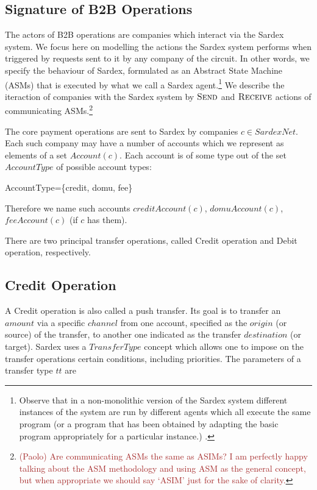 \subsection{Signature of B2B Operations}
The actors of B2B operations are companies which interact via the Sardex system. We focus here on modelling the actions the Sardex system performs when triggered by requests sent to it by any company of the circuit. In other words, we specify the behaviour of Sardex, formulated as an Abstract State Machine (ASMs) that is executed by what we call a Sardex agent.\footnote{Observe that in a non-monolithic version of the Sardex system different instances of the system are run by different agents which all execute the same program (or a program that has been obtained by adapting the basic program appropriately for a particular instance.) .} We describe the iteraction of companies with the Sardex system by $\hbox{\sc Send}$ and $\hbox{\sc Receive}$ actions of communicating ASMs.\footnote{\textcolor{brown}{(Paolo) Are communicating ASMs the same as ASIMs? I am perfectly happy talking about the ASM methodology and using ASM as the general concept, but when appropriate we should say `ASIM' just for the sake of clarity.}}

The core payment operations are sent to Sardex by companies $c \in SardexNet$. Each such company may have a number of accounts which we represent as elements of a set $Account(c)$. Each account is of some type out of the set $AccountType$ of possible account types:

\begin{asm}
AccountType=\{credit, domu, fee\}
\end{asm}

Therefore we name such accounts 
$creditAccount(c)$, $domuAccount(c)$, $feeAccount(c)$ (if $c$ has them). 

There are two principal transfer operations, called Credit operation and Debit operation, respectively.

\subsection{Credit Operation}

A Credit operation is also called a push transfer. Its goal is to transfer an $amount$ via a specific $channel$ from one account, specified as the $origin$ (or source) of the transfer, to another one indicated as the transfer $destination$ (or target). Sardex uses a $TransferType$ concept which allows one to impose on the transfer operations certain conditions, including priorities. The parameters of a transfer type $tt$ are 

